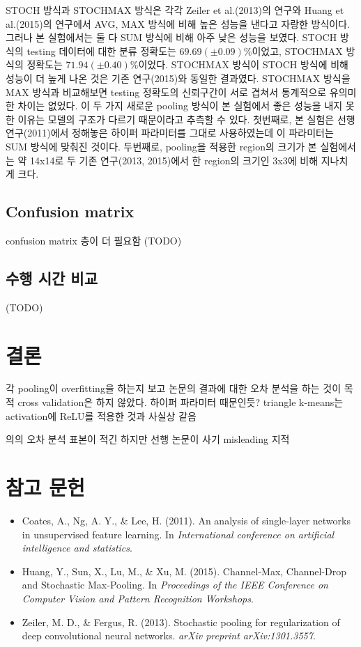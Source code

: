 \documentclass[a4paper,9pt]{article}
\begin{document}
\begin{multicols*}{2}
STOCH 방식과 STOCHMAX 방식은 각각 Zeiler et al.(2013)의 연구와 Huang et al.(2015)의 연구에서 AVG, MAX 방식에 비해 높은 성능을 낸다고 자랑한 방식이다.
그러나 본 실험에서는 둘 다 SUM 방식에 비해 아주 낮은 성능을 보였다.
STOCH 방식의 testing 데이터에 대한 분류 정확도는 $69.69(\pm 0.09)$\%이었고, STOCHMAX 방식의 정확도는 $71.94(\pm 0.40)$\%이었다.
STOCHMAX 방식이 STOCH 방식에 비해 성능이 더 높게 나온 것은 기존 연구(2015)와 동일한 결과였다.
STOCHMAX 방식을 MAX 방식과 비교해보면 testing 정확도의 신뢰구간이 서로 겹쳐서 통계적으로 유의미한 차이는 없었다.
이 두 가지 새로운 pooling 방식이 본 실험에서 좋은 성능을 내지 못한 이유는 모델의 구조가 다르기 때문이라고 추측할 수 있다.
첫번째로, 본 실험은 선행 연구(2011)에서 정해놓은 하이퍼 파라미터를 그대로 사용하였는데 이 파라미터는 SUM 방식에 맞춰진 것이다.
두번째로, pooling을 적용한 region의 크기가 본 실험에서는 약 14x14로 두 기존 연구(2013, 2015)에서 한 region의 크기인 3x3에 비해 지나치게 크다.

\subsection{Confusion matrix}

confusion matrix
층이 더 필요함
(TODO)

\subsection{수행 시간 비교}

(TODO)

\section{결론}

각 pooling이 overfitting을 하는지 보고 논문의 결과에 대한 오차 분석을 하는 것이 목적
cross validation은 하지 않았다.
하이퍼 파라미터 때문인듯?
triangle k-means는 activation에 ReLU를 적용한 것과 사실상 같음

의의
오차 분석
표본이 적긴 하지만 선행 논문이 사기
misleading 지적

\section*{참고 문헌}

\begin{itemize}
\item Coates, A., Ng, A. Y., \& Lee, H. (2011). An analysis of single-layer networks in unsupervised feature learning. In \textit{International conference on artificial intelligence and statistics}.
\item Huang, Y., Sun, X., Lu, M., \& Xu, M. (2015). Channel-Max, Channel-Drop and Stochastic Max-Pooling. In \textit{Proceedings of the IEEE Conference on Computer Vision and Pattern Recognition Workshops}.
\item Zeiler, M. D., \& Fergus, R. (2013). Stochastic pooling for regularization of deep convolutional neural networks. \textit{arXiv preprint arXiv:1301.3557}.
\end{itemize}

\end{multicols*}
\end{document}
